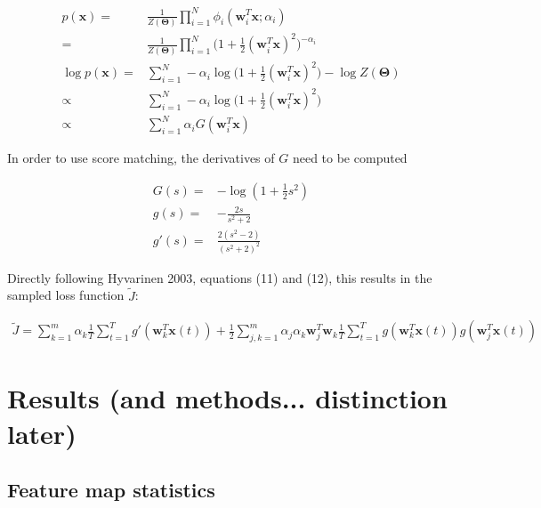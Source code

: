\documentclass{article}
\begin{document}
\begin{equation}
\begin{aligned}
	p(\mathbf{x}) =& \frac{1}{Z(\bm{\Theta})} \prod_{i=1}^{N} \phi_i (\mathbf{w}_i^T \mathbf{x} ; \alpha_i) \\
	=& \frac{1}{Z(\bm{\Theta})} \prod_{i=1}^{N} \bigg( 1 + \frac{1}{2}(\mathbf{w}_i^T \mathbf{x})^2 \bigg)^{-\alpha_i} \\
	\log p(\mathbf{x}) =& \sum_{i=1}^{N} -\alpha_i \log \bigg( 1 + \frac{1}{2}(\mathbf{w}_i^T \mathbf{x})^2 \bigg)  - \log Z(\bm{\Theta}) \\
	\propto& \sum_{i=1}^{N} -\alpha_i \log \bigg( 1 + \frac{1}{2}(\mathbf{w}_i^T \mathbf{x})^2 \bigg) \\
		\propto& \sum_{i=1}^{N} \alpha_i G(\mathbf{w}_i^T \mathbf{x})
\end{aligned}
\end{equation}

In order to use score matching, the derivatives of $G$ need to be computed

\begin{equation}
\begin{aligned}
	G(s) =& - \log(1 + \frac{1}{2} s^2) \\
	g(s) =& - \frac{2s}{s^2 + 2} \\
	g'(s) =& \frac{2(s^2 - 2)}{(s^2 + 2)^2}
\end{aligned}
\end{equation}

Directly following Hyvarinen 2003, equations (11) and (12), this results in the sampled loss function $\tilde{J}$:

\begin{equation}
\begin{aligned}
\tilde{J} = \sum_{k=1}^{m} \alpha_k \frac{1}{T} \sum_{t=1}^{T} g'(\mathbf{w}_k^T \mathbf{x}(t)) + \frac{1}{2} \sum_{j,k = 1}^{m} \alpha_j \alpha_k \mathbf{w}_j^T \mathbf{w}_k \frac{1}{T} \sum_{t=1}^{T} g(\mathbf{w}_k^T \mathbf{x}(t)) g(\mathbf{w}_j^T \mathbf{x}(t))
\end{aligned}
\end{equation}



\section{Results (and methods... distinction later)}

\subsection{Feature map statistics}
\end{document}
